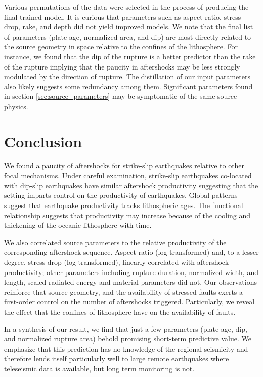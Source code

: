 \documentclass[12pt, notitlepage]{report}
\begin{document}
Various permutations of the data were selected in the process of producing the final trained model. It is curious that parameters such as aspect ratio, stress drop, rake, and depth did not yield improved models. We note that the final list of parameters (plate age, normalized area, and dip) are most directly related to the source geometry in space relative to the confines of the lithosphere. For instance, we found that the dip of the rupture is a better predictor than the rake of the rupture implying that the paucity in aftershocks may be less strongly modulated by the direction of rupture. The distillation of our input parameters also likely suggests some redundancy among them. Significant parameters found in section \ref{sec:source_parameters} may be symptomatic of the same source physics.

\section{Conclusion}

We found a paucity of aftershocks for strike-slip earthquakes relative to other focal mechanisms. Under careful examination, strike-slip earthquakes co-located with dip-slip earthquakes have similar aftershock productivity suggesting that the setting imparts control on the productivity of earthquakes. Global patterns suggest that earthquake productivity tracks lithospheric ages. The functional relationship suggests that productivity may increase because of the cooling and thickening of the oceanic lithosphere with time. 

We also correlated source parameters to the relative productivity of the corresponding aftershock sequence. Aspect ratio (log transformed) and, to a lesser degree, stress drop (log-transformed), linearly correlated with aftershock productivity; other parameters including rupture duration, normalized width, and length, scaled radiated energy and material parameters did not. Our observations reinforce that source geometry, and the availability of stressed faults exerts a first-order control on the number of aftershocks triggered. Particularly, we reveal the effect that the confines of lithosphere have on the availability of faults.

In a synthesis of our result, we find that just a few parameters (plate age, dip, and normalized rupture area) behold promising short-term predictive value. We emphasize that this prediction has no knowledge of the regional seismicity and therefore lends itself particularly well to large remote earthquakes where teleseismic data is available, but long term monitoring is not.
\end{document}
